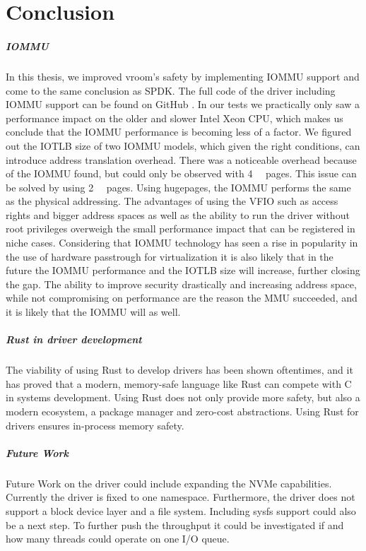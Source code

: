 \chapter{Conclusion}
\paragraph{IOMMU}
In this thesis, we improved vroom's safety by implementing IOMMU support and come to the same conclusion as SPDK. The full code of the driver including IOMMU support can be found on GitHub \cite{vroomsource}.
In our tests we practically only saw a performance impact on the older and slower Intel Xeon CPU, which makes us conclude that the IOMMU performance is becoming less of a factor.
We figured out the IOTLB size of two IOMMU models, which given the right conditions, can introduce address translation overhead.
There was a noticeable overhead because of the IOMMU found, but could only be observed with \qty{4}{\kibi\byte} pages. This issue can be solved by using \qty{2}{\mebi\byte} pages. Using hugepages, the IOMMU performs the same as the physical addressing.
The advantages of using the VFIO such as access rights and bigger address spaces as well as the ability to run the driver without root privileges overweigh the small performance impact that can be registered in niche cases.
Considering that IOMMU technology has seen a rise in popularity in the use of hardware passtrough for virtualization it is also likely that in the future the IOMMU performance and the IOTLB size will increase, further closing the gap. The ability to improve security drastically and increasing address space, while not compromising on performance are the reason the MMU succeeded, and it is likely that the IOMMU will as well.

\paragraph{Rust in driver development}
The viability of using Rust to develop drivers has been shown oftentimes, and it has proved that a modern, memory-safe language like Rust can compete with C in systems development. Using Rust does not only provide more safety, but also a modern ecosystem, a package manager and zero-cost abstractions. Using Rust for drivers ensures in-process memory safety.

\paragraph{Future Work}
Future Work on the driver could include expanding the NVMe capabilities. Currently the driver is fixed to one namespace. Furthermore, the driver does not support a block device layer and a file system. Including sysfs support could also be a next step.
To further push the throughput it could be investigated if and how many threads could operate on one I/O queue.